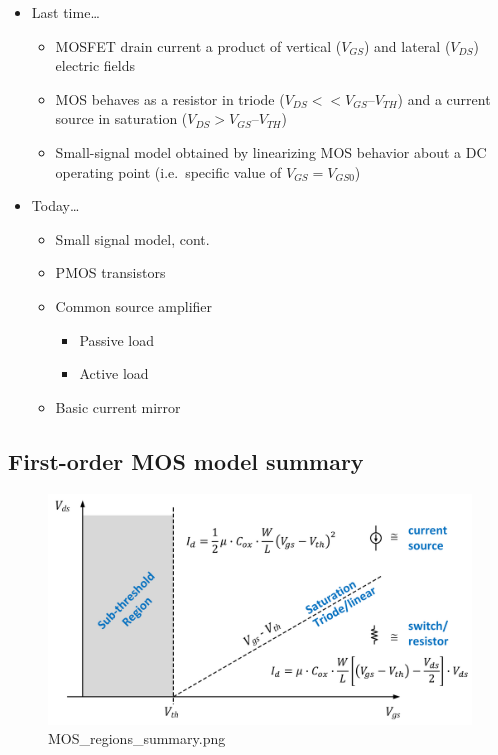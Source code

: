 \documentclass[11pt]{article}
\providecommand{\tightlist}{%
      \setlength{\itemsep}{0pt}\setlength{\parskip}{0pt}}
\begin{document}
    \begin{itemize}
\tightlist
\item
  Last time\ldots{}

  \begin{itemize}
  \tightlist
  \item
    MOSFET drain current a product of vertical (\(V_{GS}\)) and lateral
    (\(V_{DS}\)) electric fields
  \item
    MOS behaves as a resistor in triode (\(V_{DS} << V_{GS} – V_{TH}\))
    and a current source in saturation (\(V_{DS} > V_{GS} – V_{TH}\))
  \item
    Small-signal model obtained by linearizing MOS behavior about a DC
    operating point (i.e.~specific value of \(V_{GS} = V_{GS0}\))
  \end{itemize}
\item
  Today\ldots{}

  \begin{itemize}
  \tightlist
  \item
    Small signal model, cont.
  \item
    PMOS transistors
  \item
    Common source amplifier

    \begin{itemize}
    \tightlist
    \item
      Passive load
    \item
      Active load
    \end{itemize}
  \item
    Basic current mirror
  \end{itemize}
\end{itemize}

    \hypertarget{first-order-mos-model-summary}{%
\subsection{First-order MOS model
summary}\label{first-order-mos-model-summary}}

    \begin{figure}
\centering
\includegraphics{MOS_regions_summary.png}
\caption{MOS\_regions\_summary.png}
\end{figure}
\end{document}

